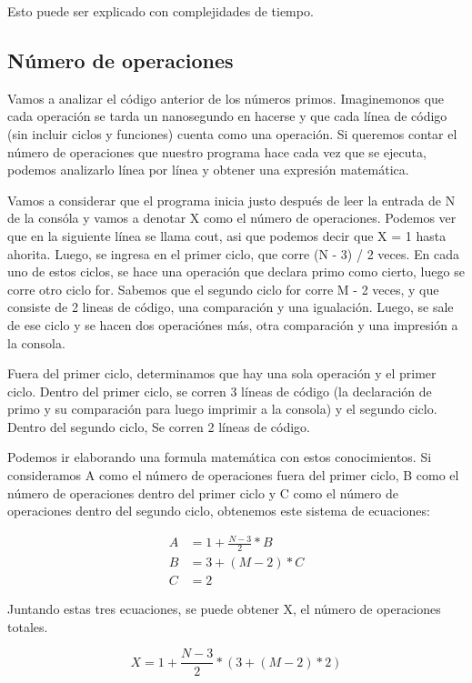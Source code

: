 \documentclass{article}
\begin{document}
Esto puede ser explicado con complejidades de tiempo.

\subsection{Número de operaciones}

Vamos a analizar el código anterior de los números primos. Imaginemonos que cada operación se tarda un nanosegundo en hacerse y que cada línea de código (sin incluir ciclos y funciones) cuenta como una operación. Si queremos contar el número de operaciones que nuestro programa hace cada vez que se ejecuta, podemos analizarlo línea por línea y obtener una expresión matemática.

Vamos a considerar que el programa inicia justo después de leer la entrada de N de la consóla y vamos a denotar X como el número de operaciones. Podemos ver que en la siguiente línea se llama cout, asi que podemos decir que X = 1 hasta ahorita. Luego, se ingresa en el primer ciclo, que corre (N - 3) / 2 veces. En cada uno de estos ciclos, se hace una operación que declara primo como cierto, luego se corre otro ciclo for. Sabemos que el segundo ciclo for corre M - 2 veces, y que consiste de 2 lineas de código, una comparación y una igualación. Luego, se sale de ese ciclo y se hacen dos operaciónes más, otra comparación y una impresión a la consola.

Fuera del primer ciclo, determinamos que hay una sola operación y el primer ciclo.
Dentro del primer ciclo, se corren 3 líneas de código (la declaración de primo y su comparación para luego imprimir a la consola) y el segundo ciclo.
Dentro del segundo ciclo, Se corren 2 líneas de código.

Podemos ir elaborando una formula matemática con estos conocimientos. Si consideramos A como el número de operaciones fuera del primer ciclo, B como el número de operaciones dentro del primer ciclo y C como el número de operaciones dentro del segundo ciclo, obtenemos este sistema de ecuaciones:

\begin{align}
    A &= 1 + \frac{N - 3}{2} * B \\
    B &= 3 + (M - 2) * C \\
    C &= 2
\end{align}

Juntando estas tres ecuaciones, se puede obtener X, el número de operaciones totales.

\begin{equation}
    X = 1 + \frac{N - 3}{2} * (3 + (M - 2) * 2)
\end{equation}
\end{document}
